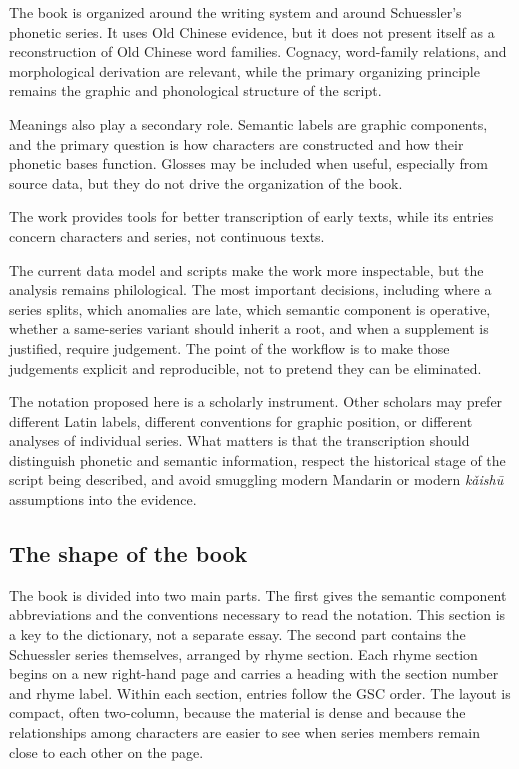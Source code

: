 The book is organized around the writing system and around Schuessler's phonetic series. It uses Old Chinese evidence, but it does not present itself as a reconstruction of Old Chinese word families. Cognacy, word-family relations, and morphological derivation are relevant, while the primary organizing principle remains the graphic and phonological structure of the script.

Meanings also play a secondary role. Semantic labels are graphic components, and the primary question is how characters are constructed and how their phonetic bases function. Glosses may be included when useful, especially from source data, but they do not drive the organization of the book.

The work provides tools for better transcription of early texts, while its entries concern characters and series, not continuous texts.

The current data model and scripts make the work more inspectable, but the analysis remains philological. The most important decisions, including where a series splits, which anomalies are late, which semantic component is operative, whether a same-series variant should inherit a root, and when a supplement is justified, require judgement. The point of the workflow is to make those judgements explicit and reproducible, not to pretend they can be eliminated.

The notation proposed here is a scholarly instrument. Other scholars may prefer different Latin labels, different conventions for graphic position, or different analyses of individual series. What matters is that the transcription should distinguish phonetic and semantic information, respect the historical stage of the script being described, and avoid smuggling modern Mandarin or modern \emph{kǎishū} assumptions into the evidence.

\subsection*{The shape of the book}

The book is divided into two main parts. The first gives the semantic component abbreviations and the conventions necessary to read the notation. This section is a key to the dictionary, not a separate essay. The second part contains the Schuessler series themselves, arranged by rhyme section. Each rhyme section begins on a new right-hand page and carries a heading with the section number and rhyme label. Within each section, entries follow the GSC order. The layout is compact, often two-column, because the material is dense and because the relationships among characters are easier to see when series members remain close to each other on the page.

